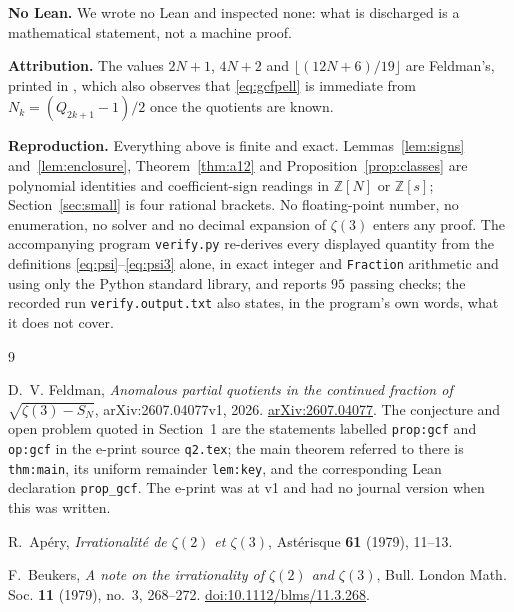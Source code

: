 \documentclass[11pt]{amsart}
\theoremstyle{definition}
\theoremstyle{remark}
\begin{document}
\medskip\noindent\textbf{No Lean.} We wrote no Lean and inspected none: what is
discharged is a mathematical statement, not a machine proof.

\medskip\noindent\textbf{Attribution.} The values $2N+1$, $4N+2$ and
$\lfloor(12N+6)/19\rfloor$ are Feldman's, printed in \cite{Feldman}, which also
observes that \eqref{eq:gcfpell} is immediate from $N_k=(Q_{2k+1}-1)/2$ once the
quotients are known.

\medskip\noindent\textbf{Reproduction.} Everything above is finite and exact.
Lemmas~\ref{lem:signs} and~\ref{lem:enclosure}, Theorem~\ref{thm:a12} and
Proposition~\ref{prop:classes} are polynomial identities and coefficient-sign
readings in $\mathbb Z[N]$ or $\mathbb Z[s]$; Section~\ref{sec:small} is four
rational brackets. No floating-point number, no enumeration, no solver and no
decimal expansion of $\zeta(3)$ enters any proof. The accompanying program
\texttt{verify.py} re-derives every displayed quantity from the definitions
\eqref{eq:psi}--\eqref{eq:psi3} alone, in exact integer and \texttt{Fraction}
arithmetic and using only the Python standard library, and reports $95$ passing
checks; the recorded run \texttt{verify.output.txt} also states, in the
program's own words, what it does not cover.

\begin{thebibliography}{9}

D.~V. Feldman,
\emph{Anomalous partial quotients in the continued fraction of
$\sqrt{\zeta(3)-S_N}$},
arXiv:2607.04077v1, 2026.
\href{https://arxiv.org/abs/2607.04077}{arXiv:2607.04077}.
The conjecture and open problem quoted in Section~1 are the statements labelled
\texttt{prop:gcf} and \texttt{op:gcf} in the e-print source \texttt{q2.tex};
the main theorem referred to there is \texttt{thm:main}, its uniform remainder
\texttt{lem:key}, and the corresponding Lean declaration \texttt{prop\_gcf}.
The e-print was at v1 and had no journal version when this was written.

R.~Ap\'ery,
\emph{Irrationalit\'e de $\zeta(2)$ et $\zeta(3)$},
Ast\'erisque \textbf{61} (1979), 11--13.

F.~Beukers,
\emph{A note on the irrationality of $\zeta(2)$ and $\zeta(3)$},
Bull. London Math. Soc. \textbf{11} (1979), no.~3, 268--272.
\href{https://doi.org/10.1112/blms/11.3.268}{doi:10.1112/blms/11.3.268}.

\end{thebibliography}
\end{document}
